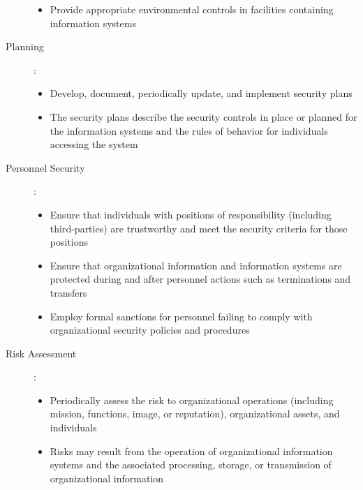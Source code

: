 \documentclass{article}
\begin{document}
\begin{description}
\begin{itemize}
                                \item Provide appropriate environmental controls in facilities containing information systems
                            \end{itemize}
                            \item [Planning]:
                            \begin{itemize}
                                \item Develop, document, periodically update, and implement security plans
                                \item The security plans describe the security controls in place or planned for the information systems and the rules of behavior for individuals accessing the system
                            \end{itemize}
                            \item [Personnel Security]: 
                            \begin{itemize}
                                \item Ensure that individuals with positions of responsibility (including third-parties) are trustworthy and meet the security criteria for those positions
                                \item Ensure that organizational information and information systems are protected during and after personnel actions such as terminations and transfers
                                \item Employ formal sanctions for personnel failing to comply with organizational security policies and procedures
                            \end{itemize}
                            \item [Risk Assessment]:
                            \begin{itemize}
                                \item Periodically assess the risk to organizational operations (including mission, functions, image, or reputation), organizational assets, and individuals
                                \item Risks may result from the operation of organizational information systems and the associated processing, storage, or transmission of organizational information
                            \end{itemize}
                                                                            
                        \end{description}
\end{document}
